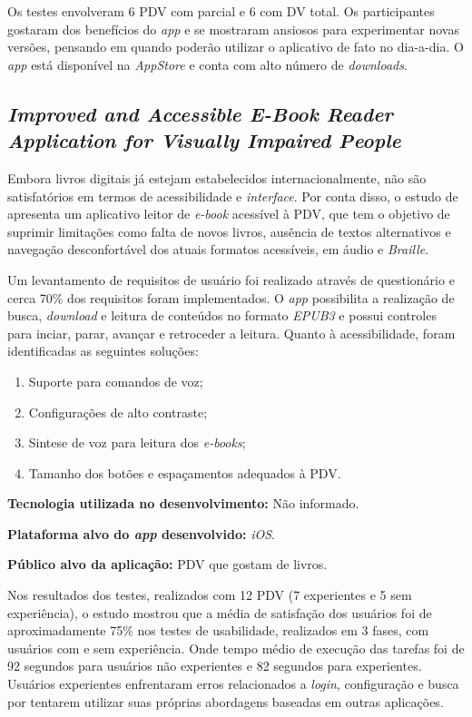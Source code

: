 Os testes envolveram 6 PDV com parcial e 6 com DV total.
Os participantes gostaram dos benefícios do \emph{app} e se mostraram ansiosos para experimentar novas versões, pensando em quando poderão utilizar o aplicativo de fato no dia-a-dia.
O \emph{app} está disponível na \emph{AppStore} e conta com alto número de \emph{downloads}.

\subsection{\emph{Improved and Accessible E-Book Reader Application for Visually Impaired People}}

Embora livros digitais já estejam estabelecidos internacionalmente, não são satisfatórios em termos de acessibilidade e \emph{interface}.
Por conta disso, o estudo de  apresenta um aplicativo leitor de \emph{e-book} acessível à PDV, que tem o objetivo de suprimir limitações como falta de novos livros, ausência de textos alternativos e navegação desconfortável dos atuais formatos acessíveis, em áudio e \emph{Braille}.

Um levantamento de requisitos de usuário foi realizado através de questionário e cerca 70\% dos requisitos foram implementados.
O \emph{app} possibilita a realização de busca, \emph{download} e leitura de conteúdos no formato \emph{EPUB3} e possui controles para inciar, parar, avançar e retroceder a leitura.
Quanto à acessibilidade, foram identificadas as seguintes soluções:

\begin{enumerate}
    \item Suporte para comandos de voz;
    \item Configurações de alto contraste;
    \item Sintese de voz para leitura dos \emph{e-books};
    \item Tamanho dos botões e espaçamentos adequados à PDV\@.
\end{enumerate}

\textbf{Tecnologia utilizada no desenvolvimento:} Não informado.

\textbf{Plataforma alvo do \emph{app} desenvolvido:} \emph{iOS}.

\textbf{Público alvo da aplicação:} PDV que gostam de livros\@.

Nos resultados dos testes, realizados com 12 PDV (7 experientes e 5 sem experiência), o estudo mostrou que a média de satisfação dos usuários foi de aproximadamente 75\% nos testes de usabilidade, realizados em 3 fases, com usuários com e sem experiência.
Onde tempo médio de execução das tarefas foi de 92 segundos para usuários não experientes e 82 segundos para experientes.
Usuários experientes enfrentaram erros relacionados a \emph{login}, configuração e busca por tentarem utilizar suas próprias abordagens baseadas em outras aplicações.

